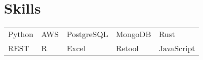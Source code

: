 \documentclass[a4paper,12pt]{article}
\begin{document}
\section{Skills}
\begin{tabularx}{\linewidth}{@{}l X@{} X@{} X@{} @{}l}
Python & AWS & PostgreSQL & MongoDB & Rust \\
REST & R & Excel & Retool & JavaScript  \\
\end{tabularx}

\vfill
{}
\end{document}
